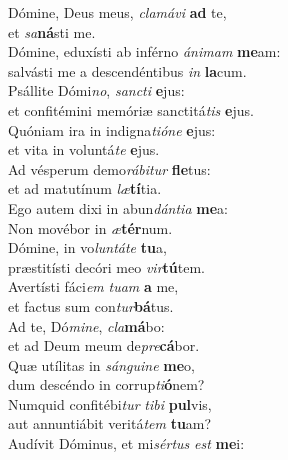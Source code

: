 \evenverse Dómine, Deus meus, \textit{cla}\textit{má}\textit{vi} \textbf{ad} te,~\*\\
\evenverse et \textit{sa}\textbf{ná}sti me.\\
\oddverse Dómine, eduxísti ab inférno \textit{á}\textit{ni}\textit{mam} \textbf{me}am:~\*\\
\oddverse salvásti me a descendéntibus \textit{in} \textbf{la}cum.\\
\evenverse Psállite Dómi\textit{no}, \textit{san}\textit{cti} \textbf{e}jus:~\*\\
\evenverse et confitémini memóriæ sanctitá\textit{tis} \textbf{e}jus.\\
\oddverse Quóniam ira in indigna\textit{ti}\textit{ó}\textit{ne} \textbf{e}jus:~\*\\
\oddverse et vita in voluntá\textit{te} \textbf{e}jus.\\
\evenverse Ad vésperum demo\textit{rá}\textit{bi}\textit{tur} \textbf{fle}tus:~\*\\
\evenverse et ad matutínum \textit{læ}\textbf{tí}tia.\\
\oddverse Ego autem dixi in abun\textit{dán}\textit{ti}\textit{a} \textbf{me}a:~\*\\
\oddverse Non movébor in \textit{æ}\textbf{tér}num.\\
\evenverse Dómine, in vo\textit{lun}\textit{tá}\textit{te} \textbf{tu}a,~\*\\
\evenverse præstitísti decóri meo \textit{vir}\textbf{tú}tem.\\
\oddverse Avertísti fáci\textit{em} \textit{tu}\textit{am} \textbf{a} me,~\*\\
\oddverse et factus sum con\textit{tur}\textbf{bá}tus.\\
\evenverse Ad te, Dó\textit{mi}\textit{ne}, \textit{cla}\textbf{má}bo:~\*\\
\evenverse et ad Deum meum de\textit{pre}\textbf{cá}bor.\\
\oddverse Quæ utílitas in \textit{sán}\textit{gui}\textit{ne} \textbf{me}o,~\*\\
\oddverse dum descéndo in corrup\textit{ti}\textbf{ó}nem?\\
\evenverse Numquid confitébi\textit{tur} \textit{ti}\textit{bi} \textbf{pul}vis,~\*\\
\evenverse aut annuntiábit veritá\textit{tem} \textbf{tu}am?\\
\oddverse Audívit Dóminus, et mi\textit{sér}\textit{tus} \textit{est} \textbf{me}i:~\*\\
